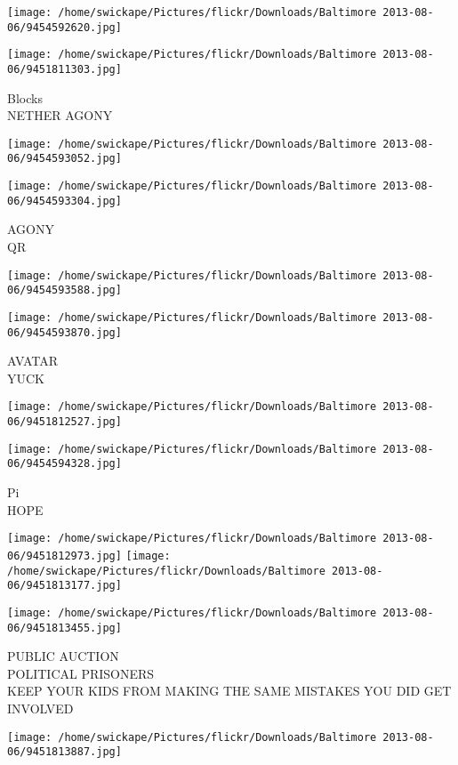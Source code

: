\documentclass[10pt,letterpaper]{article}
\begin{document}
\texttt{[image: /home/swickape/Pictures/flickr/Downloads/Baltimore 2013-08-06/9454592620.jpg]}

\vspace{0.25in}
\texttt{[image: /home/swickape/Pictures/flickr/Downloads/Baltimore 2013-08-06/9451811303.jpg]}

Blocks\\
NETHER AGONY
\pagebreak

\texttt{[image: /home/swickape/Pictures/flickr/Downloads/Baltimore 2013-08-06/9454593052.jpg]}

\vspace{0.25in}
\texttt{[image: /home/swickape/Pictures/flickr/Downloads/Baltimore 2013-08-06/9454593304.jpg]}

AGONY\\
QR
\pagebreak

\texttt{[image: /home/swickape/Pictures/flickr/Downloads/Baltimore 2013-08-06/9454593588.jpg]}

\vspace{0.25in}
\texttt{[image: /home/swickape/Pictures/flickr/Downloads/Baltimore 2013-08-06/9454593870.jpg]}

AVATAR\\
YUCK
\pagebreak

\texttt{[image: /home/swickape/Pictures/flickr/Downloads/Baltimore 2013-08-06/9451812527.jpg]}

\vspace{0.25in}
\texttt{[image: /home/swickape/Pictures/flickr/Downloads/Baltimore 2013-08-06/9454594328.jpg]}

Pi\\
HOPE
\pagebreak

\texttt{[image: /home/swickape/Pictures/flickr/Downloads/Baltimore 2013-08-06/9451812973.jpg]}
\texttt{[image: /home/swickape/Pictures/flickr/Downloads/Baltimore 2013-08-06/9451813177.jpg]}

\texttt{[image: /home/swickape/Pictures/flickr/Downloads/Baltimore 2013-08-06/9451813455.jpg]}

PUBLIC AUCTION\\
POLITICAL PRISONERS\\
KEEP YOUR KIDS FROM MAKING THE SAME MISTAKES YOU DID GET INVOLVED
\pagebreak

\texttt{[image: /home/swickape/Pictures/flickr/Downloads/Baltimore 2013-08-06/9451813887.jpg]}
\end{document}
